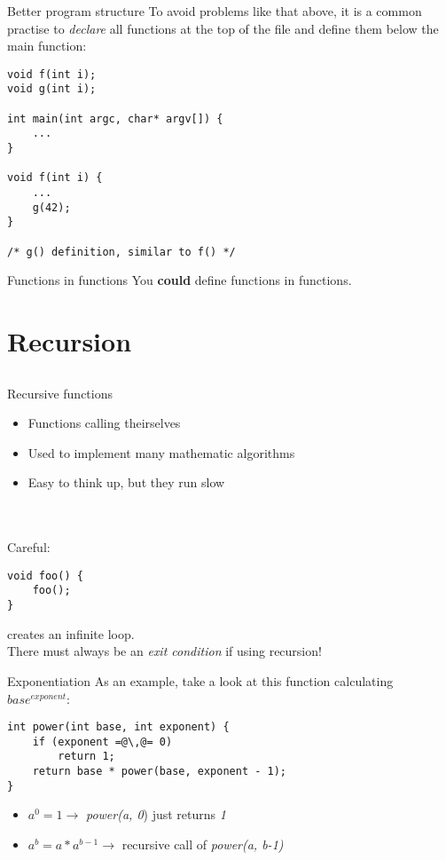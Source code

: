 \begin{frame}[fragile]{Better program structure}
	To avoid problems like that above, it is a common practise to \textit{declare} all functions at the top of the file and define them below the main function:
	\begin{lstlisting}
void f(int i);
void g(int i);

int main(int argc, char* argv[]) {
	...
}

void f(int i) {
	...
	g(42);
}

/* g() definition, similar to f() */
\end{lstlisting}
\end{frame}
\begin{frame}{Functions in functions}
	You \textbf{could} define functions in functions.\footnotemark
	
\end{frame}
\section{Recursion}
\subsection{}
\begin{frame}[fragile]{Recursive functions}
	\begin{itemize}
		\item Functions calling theirselves
		\item Used to implement many mathematic algorithms
		\item Easy to think up, but they run slow
	\end{itemize} \ \\ \ \\
	Careful:
	\begin{lstlisting}
void foo() {
	foo();
}
\end{lstlisting}
	creates an infinite loop. \\
	There must always be an \textit{exit condition} if using recursion!
\end{frame}
\begin{frame}[fragile]{Exponentiation}
As an example, take a look at this function calculating $base^{exponent}$:
	\begin{lstlisting}
int power(int base, int exponent) {
	if (exponent =@\,@= 0)
		return 1;
	return base * power(base, exponent - 1);
}
\end{lstlisting}
	\begin{itemize}
		\item $a^{0} = 1 \rightarrow$ \textit{power(a, 0}) just returns \textit{1}
		\item $a^{b} = a * a^{b-1} \rightarrow$ recursive call of \textit{power(a, b-1)}
	\end{itemize}
\end{frame}
